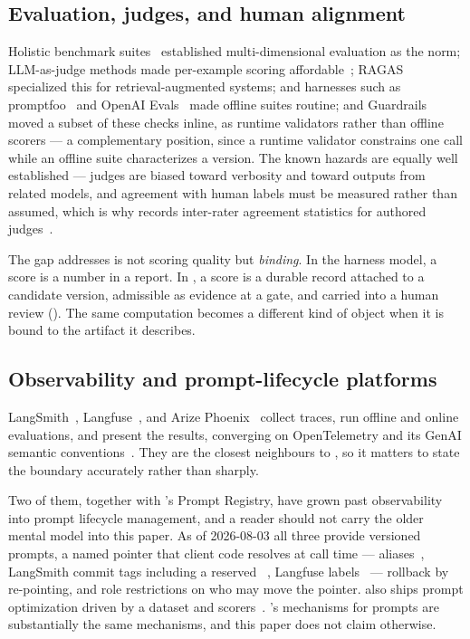 \subsection{Evaluation, judges, and human alignment}

Holistic benchmark suites~\cite{liang2023helm} established multi-dimensional
evaluation as the norm; LLM-as-judge methods made per-example scoring
affordable~\cite{zheng2023judging,liu2023geval}; RAGAS~\cite{es2024ragas}
specialized this for retrieval-augmented systems; and harnesses such as
promptfoo~\cite{promptfoo} and OpenAI Evals~\cite{openaievals} made offline suites
routine; and Guardrails~\cite{guardrails} moved a subset of these checks inline, as
runtime validators rather than offline scorers --- a complementary position, since a
runtime validator constrains one call while an offline suite characterizes a
version. The known hazards are equally well established --- judges are biased
toward verbosity and toward outputs from related models, and agreement with human
labels must be measured rather than assumed, which is why \sys records
inter-rater agreement statistics for authored
judges~\cite{cohen1960kappa,fleiss1971kappa}.

The gap \sys addresses is not scoring quality but \emph{binding}. In the harness
model, a score is a number in a report. In \sys, a score is a durable record
attached to a candidate version, admissible as evidence at a gate, and carried
into a human review (). The same computation becomes a different
kind of object when it is bound to the artifact it describes.

\subsection{Observability and prompt-lifecycle platforms}

LangSmith~\cite{langsmith}, Langfuse~\cite{langfuse}, and Arize
Phoenix~\cite{phoenix} collect traces, run offline and online evaluations, and
present the results, converging on OpenTelemetry and its GenAI semantic
conventions~\cite{opentelemetry,semanticconv}. They are the closest neighbours to
\sys, so it matters to state the boundary accurately rather than sharply.

Two of them, together with \mlflow{}'s Prompt Registry, have grown past
observability into prompt lifecycle management, and a reader should not carry the
older mental model into this paper. As of 2026-08-03 all three provide versioned
prompts, a named pointer that client code resolves at call time --- \mlflow{}
aliases~\cite{mlflowpromptregistry}, LangSmith commit tags including a reserved
~\cite{langsmithprompts}, Langfuse
labels~\cite{langfuseprompts} --- rollback by re-pointing, and role restrictions
on who may move the pointer. \mlflow{} also ships prompt optimization driven by a
dataset and scorers~\cite{mlflowoptimize}. \sys's mechanisms for prompts are
substantially the same mechanisms, and this paper does not claim otherwise.

